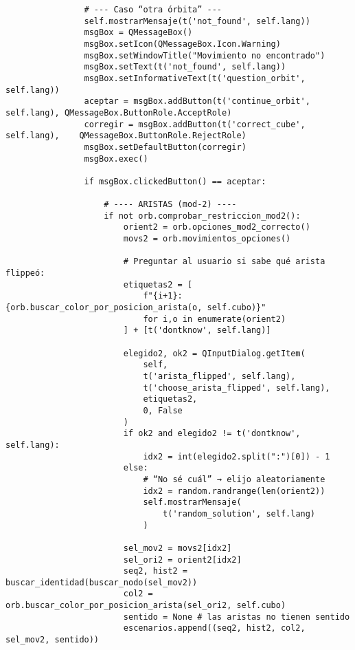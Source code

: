 \begin{lstlisting}
                # --- Caso “otra órbita” ---
                self.mostrarMensaje(t('not_found', self.lang))
                msgBox = QMessageBox()
                msgBox.setIcon(QMessageBox.Icon.Warning)
                msgBox.setWindowTitle("Movimiento no encontrado")
                msgBox.setText(t('not_found', self.lang))
                msgBox.setInformativeText(t('question_orbit', self.lang))
                aceptar = msgBox.addButton(t('continue_orbit', self.lang), QMessageBox.ButtonRole.AcceptRole)
                corregir = msgBox.addButton(t('correct_cube', self.lang),    QMessageBox.ButtonRole.RejectRole)
                msgBox.setDefaultButton(corregir)
                msgBox.exec()

                if msgBox.clickedButton() == aceptar:
                    
                    # ---- ARISTAS (mod-2) ----
                    if not orb.comprobar_restriccion_mod2():
                        orient2 = orb.opciones_mod2_correcto()  
                        movs2 = orb.movimientos_opciones()             

                        # Preguntar al usuario si sabe qué arista flippeó:
                        etiquetas2 = [
                            f"{i+1}: {orb.buscar_color_por_posicion_arista(o, self.cubo)}"
                            for i,o in enumerate(orient2)
                        ] + [t('dontknow', self.lang)]
                        
                        elegido2, ok2 = QInputDialog.getItem(
                            self,
                            t('arista_flipped', self.lang),
                            t('choose_arista_flipped', self.lang),
                            etiquetas2,
                            0, False
                        )
                        if ok2 and elegido2 != t('dontknow', self.lang):
                            idx2 = int(elegido2.split(":")[0]) - 1
                        else:
                            # “No sé cuál” → elijo aleatoriamente
                            idx2 = random.randrange(len(orient2))
                            self.mostrarMensaje(
                                t('random_solution', self.lang)
                            )
                            
                        sel_mov2 = movs2[idx2]
                        sel_ori2 = orient2[idx2]
                        seq2, hist2 = buscar_identidad(buscar_nodo(sel_mov2))
                        col2 = orb.buscar_color_por_posicion_arista(sel_ori2, self.cubo)
                        sentido = None # las aristas no tienen sentido
                        escenarios.append((seq2, hist2, col2, sel_mov2, sentido))


\end{lstlisting}
